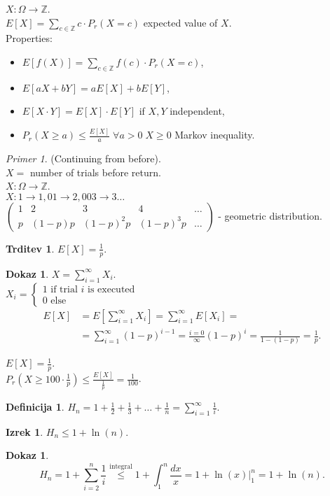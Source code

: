\documentclass[a4paper, 12pt]{book}
\newcommand*\Eval[3]{\left.#1\right\rvert_{#2}^{#3}}
\theoremstyle{definition}
\newtheorem{defn}[counter]{Definicija}
\newtheorem{claim}[counter]{Trditev}
\newtheorem{theorem}[counter]{Izrek}
\newtheorem{pro}[counter]{Dokaz}
\theoremstyle{remark}
\newtheorem*{ex}{Primer}
\newcommand{\Z}{\mathbb{Z}}
\begin{document}
$X: \Omega \to \Z$. \\
$E[X] = \sum_{c \in \Z} c \cdot P_r(X = c)$ expected value of $X$. \\
Properties:
\begin{itemize}[label=$\circ$]
  \item $E[f(X)] = \sum_{c \in \Z} f(c) \cdot P_r(X = c)$,
  \item $E[aX + bY] = aE[X] + bE[Y]$,
  \item $E[X \cdot Y] = E[X] \cdot E[Y]$ if $X, Y$ independent,
  \item $P_r(X \geq a) \leq \frac{E[X]}{a} \; \forall a > 0 \; X \geq 0$ Markov inequality.
\end{itemize}
\begin{ex}
  (Continuing from before). \\
  $X =$ number of trials before return. \\
  $X: \Omega \to \Z$. \\
  $X: 1 \to 1, 01 \to 2, 003 \to 3 \dots$ \\
  $\begin{pmatrix}
    1 & 2 & 3 & 4 & \dots \\
    p & (1-p)p & (1-p)^2 p & (1-p)^3p & \dots
  \end{pmatrix}$ - geometric distribution.
\end{ex}
\begin{claim}
  $E[X] = \frac{1}{p}$.
\end{claim}
\begin{pro}
  $X = \sum_{i=1}^{\infty} X_i$. \\
  $X_i = \begin{cases}
    1 \text{ if trial $i$ is executed} \\
    0 \text{ else}
  \end{cases}$ \\
  \begin{align*}
    E[X] &= E[\sum_{i=1}^{\infty} X_i] = \sum_{i=1}^{\infty} E[X_i] = \\
    &= \sum_{i=1}^{\infty} (1-p)^{i-1} = \frac{i=0}{\infty} (1-p)^i = \frac{1}{1-(1-p)} = \frac{1}{p}.
  \end{align*}
\end{pro}
$E[X] = \frac{1}{p}$. \\
$P_r(X \geq 100 \cdot \frac{1}{p}) \leq \frac{E[X]}{\frac{1}{p}} = \frac{1}{100}$.
\begin{defn}
  $H_n = 1 + \frac{1}{2} + \frac{1}{3} + \dots + \frac{1}{n} = \sum_{i=1}^{\infty} \frac{1}{i}$.
\end{defn}
\begin{theorem}
  $H_n \leq 1 + \ln(n)$.
\end{theorem}
\begin{pro}
  \begin{equation*}
    H_n = 1 + \sum_{i=2}^{n} \frac{1}{i} \stackrel{\text{integral}}{\leq}
    1 + \int_{1}^{n} \frac{dx}{x} = 1 + \Eval{\ln(x)}{1}{n} = 1 + \ln(n).
  \end{equation*}
\end{pro}
\end{document}
